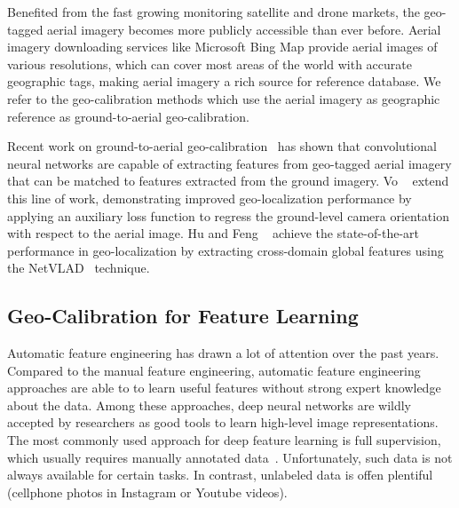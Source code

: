 Benefited from the fast growing monitoring satellite and drone markets,
the geo-tagged aerial imagery becomes more publicly accessible
than ever before. Aerial imagery downloading services like
Microsoft Bing Map provide aerial images of various
resolutions, which can cover most areas of the world with accurate
geographic tags, making aerial imagery a rich source for
reference database. We refer to the geo-calibration methods
which use the aerial imagery as geographic reference as
ground-to-aerial geo-calibration.

Recent work on ground-to-aerial
geo-calibration~\cite{lin2013cross,lin2015learning,workman2015geocnn,workman2015wide}
has shown that convolutional neural networks are capable of extracting
features from geo-tagged aerial imagery that can be matched to
features extracted from the ground imagery.  Vo
\etal~\cite{vo2016localizing} extend this line of work, demonstrating
improved geo-localization performance by applying an auxiliary loss
function to regress the ground-level camera orientation with respect
to the aerial image. Hu and Feng \etal~\cite{mh2018cvm} achieve the
state-of-the-art performance in geo-localization by extracting
cross-domain global features using the
NetVLAD~\cite{arandjelovic2016netvlad} technique.


\subsection{Geo-Calibration for Feature Learning}

Automatic feature engineering has drawn a lot of attention over the
past years. Compared to the manual feature engineering,
automatic feature engineering approaches are able to to learn useful
features without strong expert knowledge about the data. Among these
approaches, deep neural networks are wildly accepted by researchers as
good tools to learn high-level image representations.  The most
commonly used approach for deep feature learning is full supervision,
which usually requires manually annotated
data~\cite{yosinski2014transferable,zhou2016learning,wen2016discriminative}.
Unfortunately, such data is not always available for certain tasks.
In contrast, unlabeled data is offen plentiful (\ie cellphone photos
in Instagram or Youtube videos).


